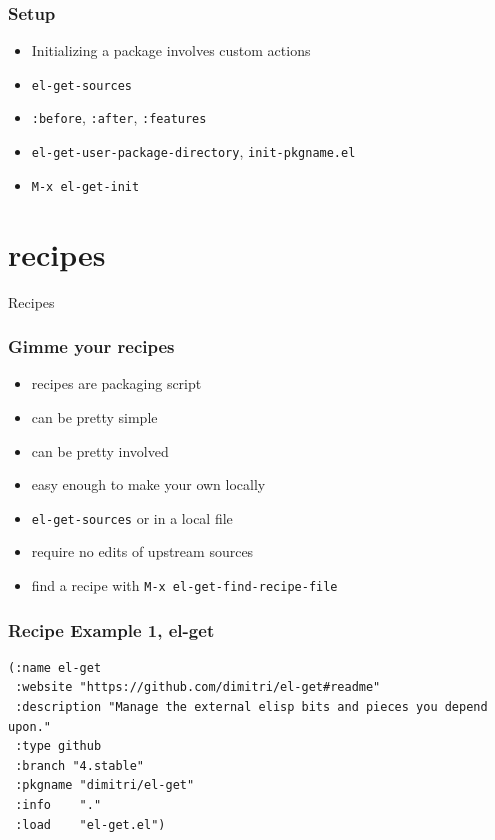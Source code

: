 \documentclass{beamer}
\begin{document}
\begin{frame}
  \frametitle{Setup}

  \vfill

  \begin{itemize}
   \item Initializing a package involves custom actions
   \item \texttt{el-get-sources}
   \item \texttt{:before}, \texttt{:after}, \texttt{:features}
   \item \texttt{el-get-user-package-directory}, \texttt{init-pkgname.el}
   \item \texttt{M-x el-get-init}
  \end{itemize}
\end{frame}

\section{recipes}

\begin{frame}[fragile]
  \begin{center}
    \Huge{Recipes}
  \end{center}
\end{frame}

\begin{frame}
  \frametitle{Gimme your recipes}

  \vfill

  \begin{itemize}
   \item recipes are packaging script
   \item can be pretty simple
   \item can be pretty involved
   \item easy enough to make your own locally
   \item \texttt{el-get-sources} or in a local file
   \item require no edits of upstream sources
   \item find a recipe with \texttt{M-x el-get-find-recipe-file}
  \end{itemize}
\end{frame}

\begin{frame}[fragile]
  \frametitle{Recipe Example 1, el-get}

   \vfill

  \begin{verbatim}
(:name el-get
 :website "https://github.com/dimitri/el-get#readme"
 :description "Manage the external elisp bits and pieces you depend upon."
 :type github
 :branch "4.stable"
 :pkgname "dimitri/el-get"
 :info    "."
 :load    "el-get.el")
  \end{verbatim}
\end{frame}
\end{document}
